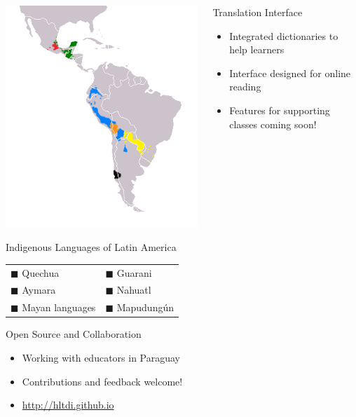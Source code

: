 \documentclass[final]{beamer}
\begin{document}
\begin{frame}{}
\begin{columns}[t]
\begin{column}{.32\linewidth}
  \centering
  \includegraphics[width=.50\linewidth]{Map-Most_Widely_Spoken_Native_Languages_in_Latin_America.png}
  \begin{block}{\large Indigenous Languages of Latin America}
    \begin{tabular}{ll}
      {\color{blue}        $\blacksquare$} Quechua &
      {\color{yellow}      $\blacksquare$} Guarani \\
      {\color{orange}      $\blacksquare$} Aymara &
      {\color{red}         $\blacksquare$} Nahuatl \\
      {\color{htmlgreen}   $\blacksquare$} Mayan languages &
      {\color{black}       $\blacksquare$} Mapudungún \\
    \end{tabular}
  \end{block}

  \begin{block}{\large Open Source and Collaboration}
    \centering
    \begin{itemize}
    \item Working with educators in Paraguay
    \item Contributions and feedback welcome!
    \item \url{http://hltdi.github.io}
    \end{itemize}
  \end{block}


  \end{column}

  \begin{column}{.32\linewidth}

  \vfill

  \begin{block}{\large Translation Interface}
    \centering
    \begin{itemize}
    \item Integrated dictionaries to help learners
    \item Interface designed for online reading
    \item Features for supporting classes coming soon!
    \end{itemize}
  \end{block}


\end{column}
\end{columns}
\end{frame}
\end{document}
